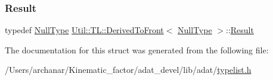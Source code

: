 \mbox{\label{structUtil_1_1TL_1_1DerivedToFront_3_01NullType_01_4_aabbce675be682669b47f114d57de74eb}} 
\subsubsection{\texorpdfstring{Result}{Result}\hspace{0.1cm}{\footnotesize\ttfamily [2/2]}}
{\footnotesize\ttfamily typedef \mbox{\hyperlink{classUtil_1_1NullType}{Null\+Type}} \mbox{\hyperlink{structUtil_1_1TL_1_1DerivedToFront}{Util\+::\+T\+L\+::\+Derived\+To\+Front}}$<$ \mbox{\hyperlink{classUtil_1_1NullType}{Null\+Type}} $>$\+::\mbox{\hyperlink{structUtil_1_1TL_1_1DerivedToFront_3_01NullType_01_4_aabbce675be682669b47f114d57de74eb}{Result}}}



The documentation for this struct was generated from the following file\+:\begin{DoxyCompactItemize}
\item 
/\+Users/archanar/\+Kinematic\+\_\+factor/adat\+\_\+devel/lib/adat/\mbox{\hyperlink{lib_2adat_2typelist_8h}{typelist.\+h}}\end{DoxyCompactItemize}
